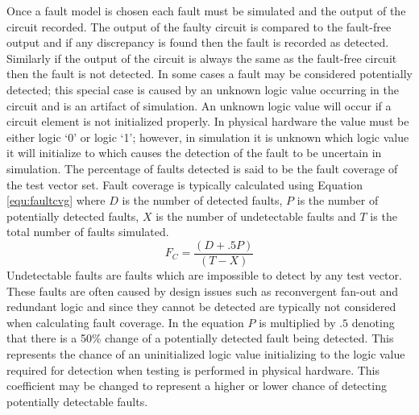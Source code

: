 \documentclass[12pt]{report}
\begin{document}
Once a fault model is chosen each fault must be simulated and the output of the circuit recorded.  The output of the faulty circuit is compared to the fault-free output and if any discrepancy is found then the fault is recorded as detected.  Similarly if the output of the circuit is always the same as the fault-free circuit then the fault is not detected\cite{defectforcmos}.  In some cases a fault may be considered potentially detected; this special case is caused by an unknown logic value occurring in the circuit and is an artifact of simulation.  An unknown logic value will occur if a circuit element is not initialized properly\cite{stroud}.  In physical hardware the value must be either logic `0' or logic `1'; however, in simulation it is unknown which logic value it will initialize to which causes the detection of the fault to be uncertain in simulation\cite{stroud}.  The percentage of faults detected is said to be the fault coverage of the test vector set\cite{defectforcmos}\cite{stroud}.  Fault coverage is typically calculated using Equation \ref{equ:faultcvg} where $D$ is the number of detected faults, $P$ is the number of potentially detected faults, $X$ is the number of undetectable faults and $T$ is the total number of faults simulated\cite{stroud}.  
\begin{equation}
F_C = \frac{(D + .5P)}{(T - X)}
\label{equ:faultcvg}
\end{equation}
Undetectable faults are faults which are impossible to detect by any test vector.  These faults are often caused by design issues such as reconvergent fan-out and redundant logic\cite{stroud} and since they cannot be detected are typically not considered when calculating fault coverage.  In the equation $P$ is multiplied by $.5$ denoting that there is a 50\% change of a potentially detected fault being detected.  This represents the chance of an uninitialized logic value initializing to the logic value required for detection when testing is performed in physical hardware.  This coefficient may be changed to represent a higher or lower chance of detecting potentially detectable faults\cite{stroud}.
\end{document}
